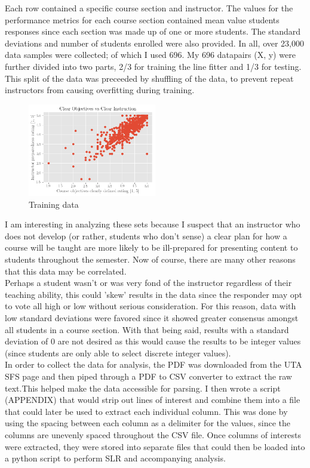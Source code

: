 \documentclass[10pt]{report}
\begin{document}
Each row contained a specific course section and instructor. The values for the performance metrics for each course section
contained mean value students responses since each section was made up of one or more students. The standard deviations 
and number of students enrolled were also provided. In all, over 23,000 data samples were collected; of which I used 696.
My 696 datapairs (X, y) were further divided into two parts, 2/3 for training the line fitter and 1/3 for testing. This 
split of the data was preceeded by shuffling of the data, to prevent repeat instructors from causing overfitting 
during training. 

\begin{figure}
    \centering
    \includegraphics[width=0.50\textwidth]{results/first_plot}
    \caption{Training data}
\end{figure}

\vspace{5mm}

I am interesting in analyzing these sets because I suspect that an instructor who does not develop (or rather, students who 
don't sense) a clear plan for how a course will be taught are more likely to be ill-prepared for presenting 
content to students throughout the semester. Now of course, there are many other reasons that this data may be correlated. \\ 
Perhaps a student wasn't or was very fond of the instructor regardless of their teaching ability, this could 'skew' results
in the data since the responder may opt to vote all high or low without serious consideration. 
For this reason, data with low standard deviations were favored since it showed greater consensus amongst all
students in a course section. With that being said, results with a standard deviation of 0 are not desired as this would cause the 
results to be integer values (since students are only able to select discrete integer values). \\

In order to collect the data for analysis, the PDF was downloaded from the UTA SFS page and then piped through a PDF to CSV
converter to extract the raw text.This helped make the data accessible for parsing. I then wrote a script (APPENDIX) that would strip out
lines of interest and combine them into a file that could later be used to extract each individual column. This was done
by using the spacing between each column as a delimiter for the values, since the columns are unevenly spaced throughout
the CSV file. Once columns of interests were extracted, they were stored into separate files that could then be loaded into
a python script to perform SLR and accompanying analysis.
\end{document}
